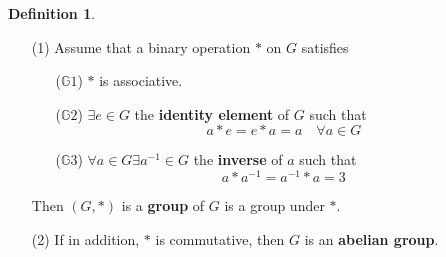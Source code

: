\documentclass{article}
\theoremstyle{definition}
\newtheorem{dfn}{Definition}
\newcommand{\GG}{\mathbb G}
\begin{document}
\begin{dfn}
	\begin{enumerate}
		\item[(1)] Assume that a binary operation $*$ on $G$ satisfies 
			\begin{enumerate}
				\item[($\GG 1$)] $*$ is associative.

				\item[($\GG 2$)] $\exists e \in G$ the \textbf{identity element} of $G$ such that
					\[
						a * e = e * a = a \quad \forall a \in G
					\]

				\item[($\GG 3$)] $\forall a \in G \exists a^{-1} \in G$ the \textbf{inverse} of $a$ such that
					\[
						a * a^{-1} = a^{-1} * a = 3
					\]
			\end{enumerate}
			Then $(G, *)$ is a \textbf{group} of $G$ is a group under $*$.

		\item[(2)] If in addition, $*$ is commutative, then $G$ is an \textbf{abelian group}.
	\end{enumerate}
\end{dfn}
\end{document}
